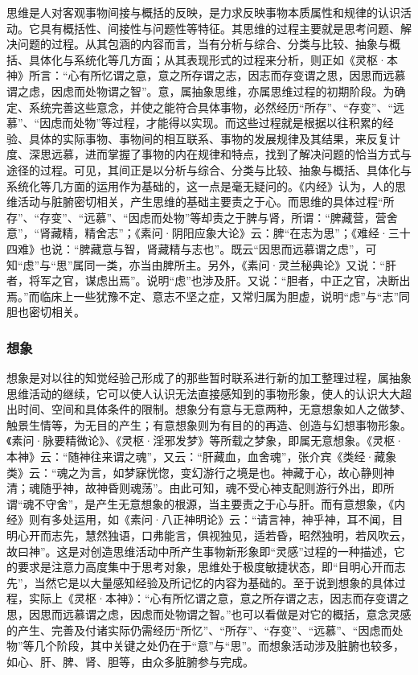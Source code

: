 \documentclass[12pt]{ctexbook}
\begin{document}
思维是人对客观事物间接与概括的反映，是力求反映事物本质属性和规律的认识活动。它具有概括性、间接性与问题性等特征。其思维的过程主要就是思考问题、解决问题的过程。从其包涵的内容而言，当有分析与综合、分类与比较、抽象与概括、具体化与系统化等几方面；从其表现形式的过程来分析，则正如《灵枢·本神》所言：“心有所忆谓之意，意之所存谓之志，因志而存变谓之思，因思而远慕谓之虑，因虑而处物谓之智”。意，属抽象思维，亦属思维过程的初期阶段。为确定、系统完善这些意念，并使之能符合具体事物，必然经历“所存”、“存变”、“远慕”、“因虑而处物”等过程，才能得以实现。而这些过程就是根据以往积累的经验、具体的实际事物、事物间的相互联系、事物的发展规律及其结果，来反复计度、深思远慕，进而掌握了事物的内在规律和特点，找到了解决问题的恰当方式与途径的过程。可见，其间正是以分析与综合、分类与比较、抽象与概括、具体化与系统化等几方面的运用作为基础的，这一点是毫无疑问的。《内经》认为，人的思维活动与脏腑密切相关，产生思维的基础主要责之于心。而思维的具体过程“所存”、“存变”、“远慕”、“因虑而处物”等却责之于脾与肾，所谓：“脾藏营，营舍意”，“肾藏精，精舍志”；《素问·阴阳应象大论》云：脾“在志为思”；《难经·三十四难》也说：“脾藏意与智，肾藏精与志也”。既云“因思而远慕谓之虑”，可知“虑”与“思”属同一类，亦当由脾所主。另外，《素问·灵兰秘典论》又说：“肝者，将军之官，谋虑出焉”。说明“虑”也涉及肝。又说：“胆者，中正之官，决断出焉。”而临床上一些犹豫不定、意志不坚之症，又常归属为胆虚，说明“虑”与“志”同胆也密切相关。

\subsubsection{想象}%

想象是对以往的知觉经验己形成了的那些暂时联系进行新的加工整理过程，属抽象思维活动的继续，它可以使人认识无法直接感知到的事物形象，使人的认识大大超出时间、空间和具体条件的限制。想象分有意与无意两种，无意想象如人之做梦、触景生情等，为无目的产生；有意想象则为有目的的再造、创造与幻想事物形象。《素问·脉要精微论》、《灵枢·淫邪发梦》等所载之梦象，即属无意想象。《灵枢·本神》云：“随神往来谓之魂”，又云：“肝藏血，血舍魂”，张介宾《类经·藏象类》云：“魂之为言，如梦寐恍惚，变幻游行之境是也。神藏于心，故心静则神清；魂随乎神，故神昏则魂荡”。由此可知，魂不受心神支配则游行外出，即所谓“魂不守舍”，是产生无意想象的根源，当主要责之于心与肝。而有意想象，《内经》则有多处运用，如《素问·八正神明论》云：“请言神，神乎神，耳不闻，目明心开而志先，慧然独语，口弗能言，俱视独见，适若昏，昭然独明，若风吹云，故曰神”。这是对创造思维活动中所产生事物新形象即“灵感”过程的一种描述，它的要求是注意力高度集中于思考对象，思维处于极度敏捷状态，即“目明心开而志先”，当然它是以大量感知经验及所记忆的内容为基础的。至于说到想象的具体过程，实际上《灵枢·本神》：“心有所忆谓之意，意之所存谓之志，因志而存变谓之思，因思而远慕谓之虑，因虑而处物谓之智。”也可以看做是对它的概括，意念灵感的产生、完善及付诸实际仍需经历“所忆”、“所存”、“存变”、“远慕”、“因虑而处物”等几个阶段，其中关键之处仍在于“意”与“思”。而想象活动涉及脏腑也较多，如心、肝、脾、肾、胆等，由众多脏腑参与完成。
\end{document}
